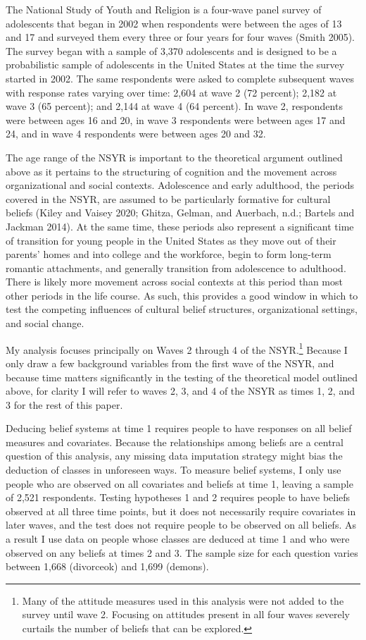 \documentclass[12pt,]{article}
\begin{document}
The National Study of Youth and Religion is a four-wave panel survey of adolescents that began in 2002 when respondents were between the ages of 13 and 17 and surveyed them every three or four years for four waves (Smith 2005). The survey began with a sample of 3,370 adolescents and is designed to be a probabilistic sample of adolescents in the United States at the time the survey started in 2002. The same respondents were asked to complete subsequent waves with response rates varying over time: 2,604 at wave 2 (72 percent); 2,182 at wave 3 (65 percent); and 2,144 at wave 4 (64 percent). In wave 2, respondents were between ages 16 and 20, in wave 3 respondents were between ages 17 and 24, and in wave 4 respondents were between ages 20 and 32.

The age range of the NSYR is important to the theoretical argument outlined above as it pertains to the structuring of cognition and the movement across organizational and social contexts. Adolescence and early adulthood, the periods covered in the NSYR, are assumed to be particularly formative for cultural beliefs (Kiley and Vaisey 2020; Ghitza, Gelman, and Auerbach, n.d.; Bartels and Jackman 2014). At the same time, these periods also represent a significant time of transition for young people in the United States as they move out of their parents' homes and into college and the workforce, begin to form long-term romantic attachments, and generally transition from adolescence to adulthood. There is likely more movement across social contexts at this period than most other periods in the life course. As such, this provides a good window in which to test the competing influences of cultural belief structures, organizational settings, and social change.

My analysis focuses principally on Waves 2 through 4 of the NSYR.\footnote{Many of the attitude measures used in this analysis were not added to the survey until wave 2. Focusing on attitudes present in all four waves severely curtails the number of beliefs that can be explored.} Because I only draw a few background variables from the first wave of the NSYR, and because time matters significantly in the testing of the theoretical model outlined above, for clarity I will refer to waves 2, 3, and 4 of the NSYR as times 1, 2, and 3 for the rest of this paper.

Deducing belief systems at time 1 requires people to have responses on all belief measures and covariates. Because the relationships among beliefs are a central question of this analysis, any missing data imputation strategy might bias the deduction of classes in unforeseen ways. To measure belief systems, I only use people who are observed on all covariates and beliefs at time 1, leaving a sample of 2,521 respondents. Testing hypotheses 1 and 2 requires people to have beliefs observed at all three time points, but it does not necessarily require covariates in later waves, and the test does not require people to be observed on all beliefs. As a result I use data on people whose classes are deduced at time 1 and who were observed on any beliefs at times 2 and 3. The sample size for each question varies between 1,668 (divorceok) and 1,699 (demons).
\end{document}
